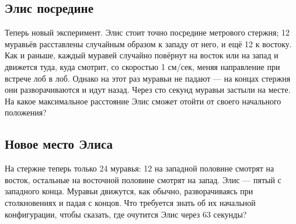 \subsection*{Элис посредине}

Теперь новый эксперимент.
Элис стоит точно посредине метрового стержня; 12 муравьёв расставлены случайным образом к западу от него, и ещё 12 к востоку.
Как и раньше, каждый муравей случайно повёрнут на восток или на запад и движется туда, куда смотрит, со скоростью 1 см/сек, меняя направление при встрече лоб в лоб.
Однако на этот раз муравьи не падают ---
на концах стержня они разворачиваются и идут назад.
Через сто секунд муравьи застыли на месте.
На какое максимальное расстояние Элис сможет отойти от своего начального положения?

\subsection*{Новое место Элиса}

На стержне теперь только 24 муравья:
12 на западной половине смотрят на восток,
остальные на восточной половине смотрят на запад.
Элис --- пятый с западного конца.
Муравьи движутся, как обычно, разворачиваясь при столкновениях и падая с концов.
Что требуется знать об их начальной конфигурации, чтобы сказать, где очутится Элис через 63 секунды?
